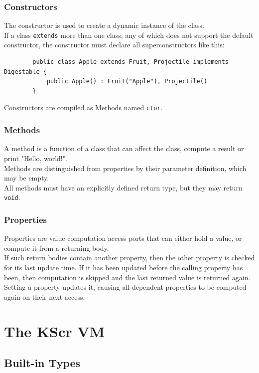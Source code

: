 \documentclass{docs}
\begin{document}
    \subsubsection{Constructors}
    The constructor is used to create a dynamic instance of the class. \\
    If a class \texttt{extends} more than one class, any of which does not support the default constructor, the constructor must declare all superconstructors like this:
    \begin{verbatim}
        public class Apple extends Fruit, Projectile implements Digestable {
            public Apple() : Fruit("Apple"), Projectile()
        }
    \end{verbatim}
    Constructors are compiled as Methods named \texttt{ctor}.
    
    \subsubsection{Methods}
    A method is a function of a class that can affect the class, compute a result or print "Hello, world!". \\
    Methods are distinguished from properties by their parameter definition, which may be empty. \\
    All methods must have an explicitly defined return type, but they may return \texttt{void}.
    
    \subsubsection{Properties}
    Properties are value computation access ports that can either hold a value, or compute it from a returning body. \\
    If such return bodies contain another property, then the other property is checked for its last update time. If it has been updated before the calling property has been, then computation is skipped and the last returned value is returned again.
    Setting a property updates it, causing all dependent properties to be computed again on their next access.
    
    \pagebreak
    \section{The KScr VM}
    
    \subsection{Built-in Types}
\end{document}
